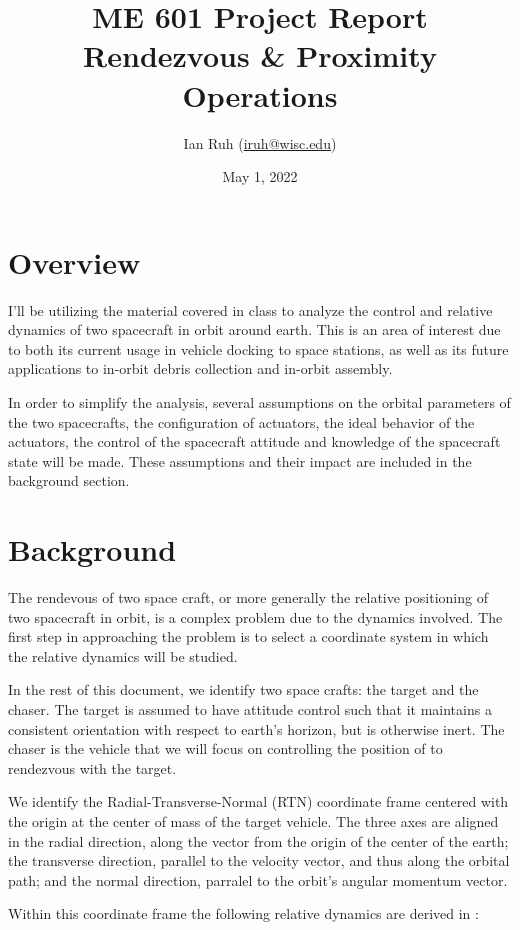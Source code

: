 \documentclass[12pt, letterpaper,titlepage]{article}
\title{ME 601 Project Report \\
\textbf{Rendezvous \& Proximity Operations}}
\author{Ian Ruh (\href{mailto:iruh@wisc.edu}{iruh@wisc.edu})}
\date{May 1, 2022}
\begin{document}
\maketitle

\section{Overview}

I'll be utilizing the material covered in class to analyze the control
and relative dynamics of two spacecraft in orbit around earth. This is an
area of interest due to both its current usage in vehicle docking to space
stations, as well as its future applications to in-orbit debris collection and
in-orbit assembly.

In order to simplify the analysis, several assumptions on the orbital
parameters of the two spacecrafts, the configuration of actuators, the ideal
behavior of the actuators, the control of the spacecraft attitude and knowledge
of the spacecraft state will be made. These assumptions and their impact are
included in the background section.

\section{Background}

The rendevous of two space craft, or more generally the relative positioning of
two spacecraft in orbit, is a complex problem due to the dynamics involved. The
first step in approaching the problem is to select a coordinate system in which
the relative dynamics will be studied.

In the rest of this document, we
identify two space crafts: the target and the chaser. The target is assumed to
have attitude control such that it maintains a consistent orientation with
respect to earth's horizon, but is otherwise inert. The chaser is the vehicle
that we will focus on controlling the position of to rendezvous
with the target.

We identify the Radial-Transverse-Normal (RTN) coordinate frame centered with
the origin at the center of mass of the target vehicle. The three axes are
aligned in the radial direction, along the vector from the origin of the center
of the earth; the transverse direction, parallel to the velocity vector, and
thus along the orbital path; and the normal direction, parralel to the orbit's
angular momentum vector.

Within this coordinate frame the following relative dynamics are derived in
\cite{sullivan_comprehensive_2017}:
\end{document}
